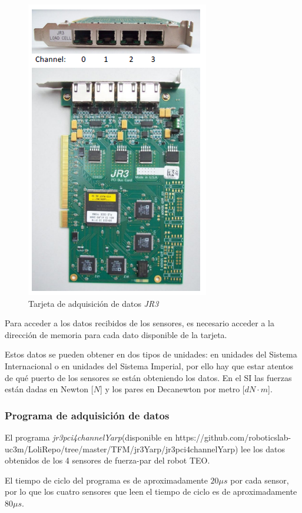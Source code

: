 \begin{figure}[H]
\centering
\includegraphics[scale=0.7]{imagenes/apartado_3/35_tarjeta_adquisicion_datos}
\caption{Tarjeta de adquisición de datos \textsl{JR3}}
\label{figura35}
\end{figure}

Para acceder a los datos recibidos de los sensores, es necesario acceder a la dirección de memoria para cada dato disponible de la tarjeta.

Estos datos se pueden obtener en dos tipos de unidades: en unidades del Sistema Internacional o en unidades del Sistema Imperial, por ello hay que estar atentos de qué puerto de los sensores se están obteniendo los datos. En el SI las fuerzas están dadas en Newton [$N$] y los pares en Decanewton por metro [$dN \cdot m$].

\subsubsection{Programa de adquisición de datos}

El programa \textsl{jr3pci4channelYarp}(disponible en https://github.com/roboticslab-uc3m/LoliRepo/tree/master/TFM/jr3Yarp/jr3pci4channelYarp) lee los datos obtenidos de los 4 sensores de fuerza-par del robot TEO.

El tiempo de ciclo del programa es de aproximadamente $20\mu s$ por cada sensor, por lo que los cuatro sensores que leen el tiempo de ciclo es de aproximadamente $80\mu s$.

